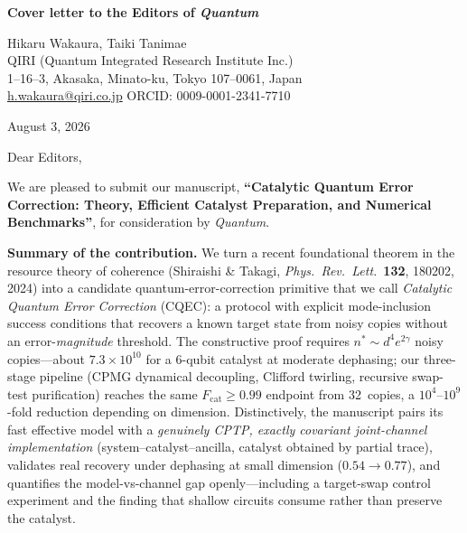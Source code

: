 \documentclass[11pt,a4paper]{article}
\begin{document}
\textbf{Cover letter to the Editors of \emph{Quantum}}

\vspace{0.4cm}

Hikaru Wakaura, Taiki Tanimae \\
QIRI (Quantum Integrated Research Institute Inc.)\\
1--16--3, Akasaka, Minato-ku, Tokyo 107--0061, Japan\\
\href{mailto:h.wakaura@qiri.co.jp}{h.wakaura@qiri.co.jp} \quad ORCID: 0009-0001-2341-7710

\vspace{0.3cm}
August 3, 2026

\vspace{0.4cm}

Dear Editors,

\medskip

We are pleased to submit our manuscript, \textbf{``Catalytic Quantum Error Correction: Theory, Efficient Catalyst Preparation, and Numerical Benchmarks''}, for consideration by \emph{Quantum}.

\medskip

\textbf{Summary of the contribution.}
We turn a recent foundational theorem in the resource theory of coherence (Shiraishi \& Takagi, \emph{Phys.\ Rev.\ Lett.}\ \textbf{132}, 180202, 2024) into a candidate quantum-error-correction primitive that we call \emph{Catalytic Quantum Error Correction} (CQEC): a protocol with explicit mode-inclusion success conditions that recovers a known target state from noisy copies without an error-\emph{magnitude} threshold.
The constructive proof requires $n^{*} \sim d^{4} e^{2\gamma}$ noisy copies---about $7.3 \times 10^{10}$ for a 6-qubit catalyst at moderate dephasing; our three-stage pipeline (CPMG dynamical decoupling, Clifford twirling, recursive swap-test purification) reaches the same $F_\mathrm{cat} \geq 0.99$ endpoint from 32~copies, a $10^{4}$--$10^{9}$-fold reduction depending on dimension.
Distinctively, the manuscript pairs its fast effective model with a \emph{genuinely CPTP, exactly covariant joint-channel implementation} (system--catalyst--ancilla, catalyst obtained by partial trace), validates real recovery under dephasing at small dimension ($0.54 \to 0.77$), and quantifies the model-vs-channel gap openly---including a target-swap control experiment and the finding that shallow circuits consume rather than preserve the catalyst.

\medskip
\end{document}
